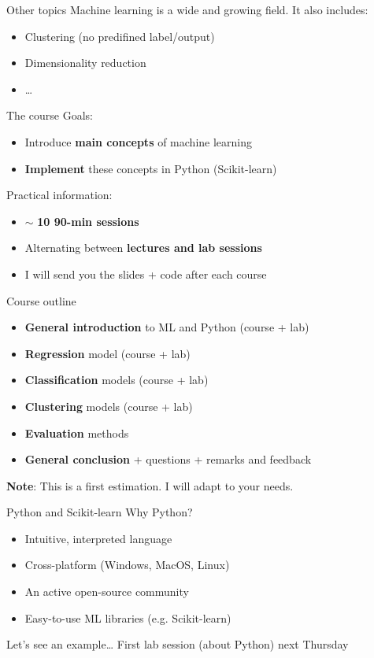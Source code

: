 \documentclass{beamer}
\begin{document}
\begin{frame}{Other topics}
\vfill
Machine learning is a wide and growing field. It also includes:	
\pause 
\vfill
\begin{itemize}
	\item Clustering (no predifined label/output)
\pause 
\vfill
	\item Dimensionality reduction
\pause 
\vfill
	\item \ldots
\end{itemize}
\vfill
\end{frame}

\begin{frame}{The course}
Goals:
\begin{itemize}
	\item Introduce \textbf{main concepts} of machine learning
	\item \textbf{Implement} these concepts in Python (Scikit-learn)
\end{itemize}
\vfill
\pause 
Practical information:
\begin{itemize}
	\item $\sim$ \textbf{10 90-min sessions}
	\item Alternating between \textbf{lectures and lab sessions}
	\item I will send you the slides + code after each course
\end{itemize}
\end{frame}

\begin{frame}{Course outline}
\vfill
\begin{itemize}
  \item \textbf{General introduction} to ML and Python (course + lab)
  \item \textbf{Regression} model (course + lab)
  \item \textbf{Classification} models (course + lab)
  \item \textbf{Clustering} models (course + lab)
  \item \textbf{Evaluation} methods
  \item \textbf{General conclusion} + questions + remarks and feedback
\end{itemize}
\vfill
\textbf{Note}: This is a first estimation. I will adapt to your needs.
\end{frame}

\begin{frame}{Python and Scikit-learn}
\vfill
Why Python?
\vfill
\begin{itemize}
	\item Intuitive, interpreted language
	\item Cross-platform (Windows, MacOS, Linux)
	\item An active open-source community
	\item Easy-to-use ML libraries (e.g. Scikit-learn)
\end{itemize}
\vfill
Let's see an example\ldots
\vfill
First lab session (about Python) next Thursday
\vfill
\end{frame}
\end{document}
